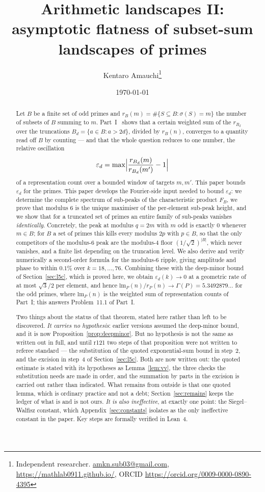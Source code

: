 \documentclass[11pt,a4paper]{article}
\title{Arithmetic landscapes II:\\
asymptotic flatness of subset-sum landscapes of primes}
\author{Kentaro Amauchi\thanks{Independent researcher.
\href{mailto:amkn.sub03@gmail.com}{amkn.sub03@gmail.com},
\url{https://mathlab0911.github.io/}, ORCID \url{https://orcid.org/0009-0000-0890-4395}}}
\date{\today}
\theoremstyle{plain}
\theoremstyle{definition}
\theoremstyle{remark}
\newcommand{\Xref}[3]{#3}
\begin{document}
\maketitle

\begin{abstract}
Let $B$ be a finite set of odd primes and $r_B(m)=\#\{S\subseteq B:\sigma(S)=m\}$
the number of subsets of $B$ summing to $m$. Part~I~\cite{P1} shows that a
certain weighted sum of the $r_{B_d}$ over the truncations $B_d=\{a\in B:a>2d\}$,
divided by $r_B(n)$, converges to a quantity read off $B$ by counting --- and
that the whole question reduces to one number, the relative oscillation
\[
  \varepsilon_d=\max\Bigl|\frac{r_{B_d}(m)}{r_{B_d}(m')}-1\Bigr|
\]
of a representation count over a bounded window of targets $m,m'$. This paper
bounds $\varepsilon_d$ for the primes. This paper develops the Fourier-side input needed to bound
$\varepsilon_d$: we determine the complete spectrum of sub-peaks of the
characteristic product $F_B$, we prove that modulus $6$ is the unique maximiser
of the per-element sub-peak height, and we show that for a truncated set of
primes an entire family of sub-peaks vanishes \emph{identically}. Concretely,
the peak at modulus $q=2m$ with $m$ odd is exactly $0$ whenever $m\in B$; for
$B$ a set of primes this kills every modulus $2p$ with $p\in B$, so that the
only competitors of the modulus-$6$ peak are the modulus-$4$ floor
$(1/\sqrt2)^{|B|}$, which never vanishes, and a finite list depending on the
truncation level. We also derive and verify numerically a second-order formula
for the modulus-$6$ ripple, giving amplitude and phase to within $0.1\%$ over
$k=18,\dots,76$. Combining these with the deep-minor bound of
Section~\ref{sec:l5c}, which is proved here, we obtain $\varepsilon_d(k)\to0$
at a geometric rate of at most $\sqrt3/2$ per element, and hence
$\mathrm{lm}_P(n)/r_P(n)\to\Gamma(P)=5.3492879\ldots$ for the odd primes, where
$\mathrm{lm}_P(n)$ is the weighted sum of representation counts of Part~I; this
answers Problem~\Xref{paper}{prob:flatness}{11.1} of Part~I.

Two things about the status of that theorem, stated here rather than left to be
discovered. \emph{It carries no hypothesis}: earlier versions assumed the
deep-minor bound, and it is now Proposition~\ref{prop:deepminor}. But no
hypothesis is not the same as written out in full, and until r121 two steps of
that proposition were not written to referee standard --- the substitution of the
quoted exponential-sum bound in step~2, and the excision in step~4 of
Section~\ref{sec:l5c}. Both are now written out: the quoted estimate is stated
with its hypotheses as Lemma~\ref{lem:vv}, the three checks the substitution
needs are made in order, and the summation by parts in the excision is carried
out rather than indicated. What remains from outside is that one quoted lemma,
which is ordinary practice and not a debt; Section~\ref{sec:remains} keeps the
ledger of what is and is not ours. \emph{It is also ineffective}, at exactly one
point: the Siegel--Walfisz constant, which Appendix~\ref{sec:constants} isolates
as the only ineffective constant in the paper. Key steps are formally verified
in Lean~4.
\end{abstract}
\end{document}
